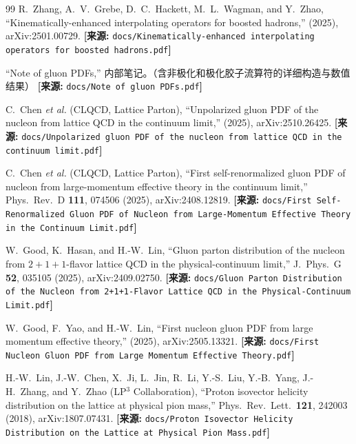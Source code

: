 \documentclass[12pt,a4paper]{ctexart}
\theoremstyle{definition}
\begin{document}
\begin{thebibliography}{99}
R.~Zhang, A.~V.~Grebe, D.~C.~Hackett, M.~L.~Wagman, and Y.~Zhao,
``Kinematically-enhanced interpolating operators for boosted hadrons,''
(2025), arXiv:2501.00729.
\quad\textbf{[来源:} \texttt{docs/Kinematically-enhanced interpolating operators for boosted hadrons.pdf}\textbf{]}


``Note of gluon PDFs,''
内部笔记。（含非极化和极化胶子流算符的详细构造与数值结果）
\quad\textbf{[来源:} \texttt{docs/Note of gluon PDFs.pdf}\textbf{]}


C.~Chen \textit{et al.} (CLQCD, Lattice Parton),
``Unpolarized gluon PDF of the nucleon from lattice QCD in the continuum limit,''
(2025), arXiv:2510.26425.
\quad\textbf{[来源:} \texttt{docs/Unpolarized gluon PDF of the nucleon from lattice QCD in the continuum limit.pdf}\textbf{]}

C.~Chen \textit{et al.} (CLQCD, Lattice Parton),
``First self-renormalized gluon PDF of nucleon from large-momentum effective theory in the continuum limit,''
Phys.\ Rev.\ D \textbf{111}, 074506 (2025), arXiv:2408.12819.
\quad\textbf{[来源:} \texttt{docs/First Self-Renormalized Gluon PDF of Nucleon from Large-Momentum Effective Theory in the Continuum Limit.pdf}\textbf{]}

W.~Good, K.~Hasan, and H.-W.~Lin,
``Gluon parton distribution of the nucleon from $2+1+1$-flavor lattice QCD in the physical-continuum limit,''
J.\ Phys.\ G \textbf{52}, 035105 (2025), arXiv:2409.02750.
\quad\textbf{[来源:} \texttt{docs/Gluon Parton Distribution of the Nucleon from 2+1+1-Flavor Lattice QCD in the Physical-Continuum Limit.pdf}\textbf{]}

W.~Good, F.~Yao, and H.-W.~Lin,
``First nucleon gluon PDF from large momentum effective theory,''
(2025), arXiv:2505.13321.
\quad\textbf{[来源:} \texttt{docs/First Nucleon Gluon PDF from Large Momentum Effective Theory.pdf}\textbf{]}

H.-W.~Lin, J.-W.~Chen, X.~Ji, L.~Jin, R.~Li, Y.-S.~Liu, Y.-B.~Yang, J.-H.~Zhang, and Y.~Zhao (LP$^3$ Collaboration),
``Proton isovector helicity distribution on the lattice at physical pion mass,''
Phys.\ Rev.\ Lett.\ \textbf{121}, 242003 (2018), arXiv:1807.07431.
\quad\textbf{[来源:} \texttt{docs/Proton Isovector Helicity Distribution on the Lattice at Physical Pion Mass.pdf}\textbf{]}


\end{thebibliography}
\end{document}
